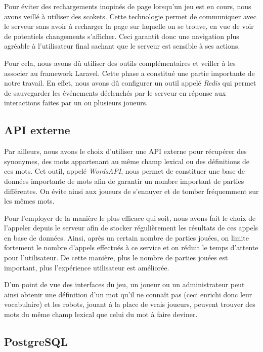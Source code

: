 \documentclass{tnreport}
\begin{document}
Pour éviter des rechargements inopinés de page lorsqu'un jeu est en cours, nous avons veillé à utiliser des scokets. Cette technologie permet de communiquer avec le serveur sans avoir à recharger la page sur laquelle on se trouve, en vue de voir de potentiels changements s'afficher. Ceci garantit donc une navigation plus agréable à l'utilisateur final sachant que le serveur est sensible à ses actions. 

Pour cela, nous avons dû utiliser des outils complémentaires et veiller à les associer au framework Laravel. Cette phase a constitué une partie importante de notre travail. En effet, nous avons dû configurer un outil appelé \textit{Redis} qui permet de sauvegarder les événements déclenchés par le serveur en réponse aux interactions faites par un ou plusieurs joueurs.

\subsection{API externe}

Par ailleurs, nous avons le choix d'utiliser une API externe pour récupérer des synonymes, des mots appartenant au même champ lexical ou des définitions de ces mots. Cet outil, appelé \textit{WordsAPI}, nous permet de constituer une base de données importante de mots afin de garantir un nombre important de parties différentes. On évite ainsi aux joueurs de s'ennuyer et de tomber fréquemment sur les mêmes mots. 

Pour l'employer de la manière le plus efficace qui soit, nous avons fait le choix de l'appeler depuis le serveur afin de stocker régulièrement les résultats de ces appels en base de données. Ainsi, après un certain nombre de parties jouées, on limite fortement le nombre d'appels effectués à ce service et on réduit le temps d'attente pour l'utilisateur. De cette manière, plus le nombre de parties jouées est important, plus l'expérience utilisateur est améliorée.

D'un point de vue des interfaces du jeu, un joueur ou un administrateur peut ainsi obtenir une définition d'un mot qu'il ne connaît pas (ceci enrichi donc leur vocabulaire) et les robots, jouant à la place de vrais joueurs, peuvent trouver des mots du même champ lexical que celui du mot à faire deviner. 

\subsection{PostgreSQL}
\end{document}
